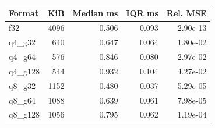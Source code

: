\begin{tabular}{lrrrr}
\toprule
Format & KiB & Median ms & IQR ms & Rel. MSE \\
\midrule
f32 & 4096 & 0.506 & 0.093 & 2.90e-13 \\
q4\_g32 & 640 & 0.647 & 0.064 & 1.80e-02 \\
q4\_g64 & 576 & 0.846 & 0.080 & 2.97e-02 \\
q4\_g128 & 544 & 0.932 & 0.104 & 4.27e-02 \\
q8\_g32 & 1152 & 0.480 & 0.037 & 5.29e-05 \\
q8\_g64 & 1088 & 0.639 & 0.061 & 7.98e-05 \\
q8\_g128 & 1056 & 0.795 & 0.062 & 1.19e-04 \\
\bottomrule
\end{tabular}

